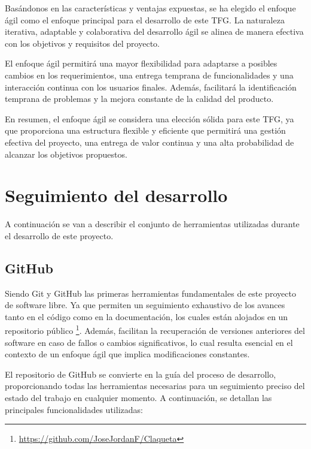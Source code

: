 Basándonos en las características y ventajas expuestas, se ha elegido el enfoque ágil como el enfoque principal para el desarrollo de este TFG. La naturaleza iterativa, adaptable y colaborativa del desarrollo ágil se alinea de manera efectiva con los objetivos y requisitos del proyecto.

El enfoque ágil permitirá una mayor flexibilidad para adaptarse a posibles cambios en los requerimientos, una entrega temprana de funcionalidades y una interacción continua con los usuarios finales. Además, facilitará la identificación temprana de problemas y la mejora constante de la calidad del producto.

En resumen, el enfoque ágil se considera una elección sólida para este TFG, ya que proporciona una estructura flexible y eficiente que permitirá una gestión efectiva del proyecto, una entrega de valor continua y una alta probabilidad de alcanzar los objetivos propuestos.


\section{Seguimiento del desarrollo}

A continuación se van a describir el conjunto de herramientas utilizadas durante el desarrollo de este proyecto.

\subsection{GitHub}

Siendo Git y GitHub las primeras herramientas fundamentales de este proyecto de software libre. Ya que permiten un seguimiento exhaustivo de los avances tanto en el código como en la documentación, los cuales están alojados en un repositorio público \footnote{\url{https://github.com/JoseJordanF/Claqueta}}. Además, facilitan la recuperación de versiones anteriores del software en caso de fallos o cambios significativos, lo cual resulta esencial en el contexto de un enfoque ágil que implica modificaciones constantes.

El repositorio de GitHub se convierte en la guía del proceso de desarrollo, proporcionando todas las herramientas necesarias para un seguimiento preciso del estado del trabajo en cualquier momento. A continuación, se detallan las principales funcionalidades utilizadas:

